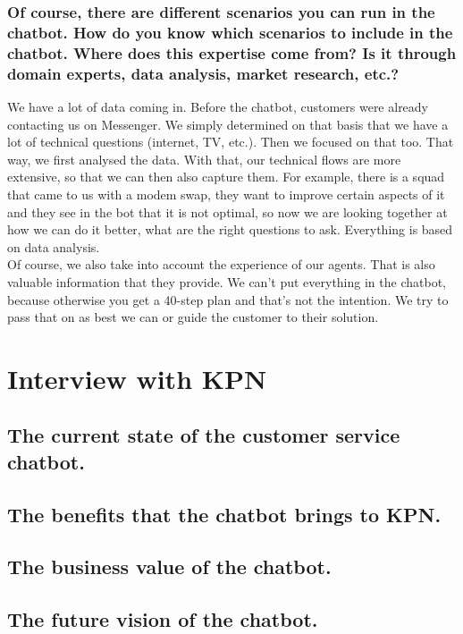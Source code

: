 \begin{appendices}
	\subsubsection{Of course, there are different scenarios you can run in the chatbot. How do you know which scenarios to include in the chatbot. Where does this expertise come from? Is it through domain experts, data analysis, market research, etc.?}
	We have a lot of data coming in. Before the chatbot, customers were already contacting us on Messenger. We simply determined on that basis that we have a lot of technical questions (internet, TV, etc.). Then we focused on that too. That way, we first analysed the data. With that, our technical flows are more extensive, so that we can then also capture them. For example, there is a squad that came to us with a modem swap, they want to improve certain aspects of it and they see in the bot that it is not optimal, so now we are looking together at how we can do it better, what are the right questions to ask. Everything is based on data analysis.\\
	Of course, we also take into account the experience of our agents. That is also valuable information that they provide. We can't put everything in the chatbot, because otherwise you get a 40-step plan and that's not the intention. We try to pass that on as best we can or guide the customer to their solution.
	
	\section{Interview with KPN}
	\label{in:KPN}
	\subsection{The current state of the customer service chatbot.}
	\subsection{The benefits that the chatbot brings to KPN.}
	\subsection{The business value of the chatbot.}
	\subsection{The future vision of the chatbot.}
	
	
\end{appendices}

